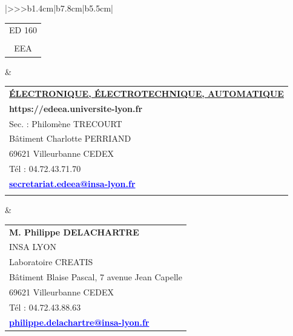 \begin{center}
\begin{tabular}{|>{\centering}>{}>{\color{txtED}}b{1.4cm}|b{7.8cm}|b{5.5cm}|}
\hline	
	\begin{tabular}{@{}c@{}}
		ED 160\\
		\\
		EEA\end{tabular}&
	\begin{tabular}{@{}l@{}}
		\\
		\textbf{\underline{ÉLECTRONIQUE, ÉLECTROTECHNIQUE, AUTOMATIQUE}}\\[.2cm]
		\textcolor{siteED}{\textbf{https://edeea.universite-lyon.fr}}\\
		Sec. : Philomène TRECOURT\\
		Bâtiment Charlotte PERRIAND\\
		69621 Villeurbanne CEDEX\\
		Tél : 04.72.43.71.70\\
		\textcolor{blue}{\underline{\textbf{secretariat.edeea@insa-lyon.fr}}}\\
		\\
	\end{tabular}&
	\begin{tabular}{@{}l@{}}
		\textcolor{txtED}{\textbf{M. Philippe DELACHARTRE}}\\
		INSA LYON\\
		Laboratoire CREATIS\\
		Bâtiment Blaise Pascal, 7 avenue Jean Capelle\\
		69621 Villeurbanne CEDEX\\
		Tél : 04.72.43.88.63\\
		\textcolor{blue}{\underline{\textbf{philippe.delachartre@insa-lyon.fr}}}\\
	\end{tabular}\\
		

\end{tabular}
\end{center}

